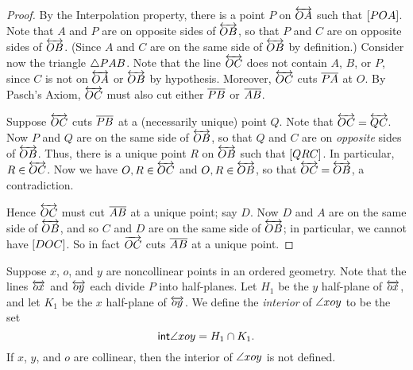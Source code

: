 \begin{proof}
By the Interpolation property, there is a point \(P\) on \(\overleftrightarrow{OA}\) such that \([ P O A ]\).
Note that \(A\) and \(P\) are on opposite sides of \(\overleftrightarrow{OB}\), so that \(P\) and \(C\) are on opposite sides of \(\overleftrightarrow{OB}\).
(Since \(A\) and \(C\) are on the same side of \(\overleftrightarrow{OB}\) by definition.) Consider now the triangle \(\bigtriangleup{PAB}\).
Note that the line \(\overleftrightarrow{OC}\) does not contain \(A\), \(B\), or \(P\), since \(C\) is not on \(\overleftrightarrow{OA}\) or \(\overleftrightarrow{OB}\) by hypothesis.
Moreover, \(\overleftrightarrow{OC}\) cuts \(\overline{PA}\) at \(O\).
By Pasch's Axiom, \(\overleftrightarrow{OC}\) must also cut either \(\overline{PB}\) or \(\overline{AB}\).

Suppose \(\overleftrightarrow{OC}\) cuts \(\overline{PB}\) at a (necessarily unique) point \(Q\).
Note that \(\overleftrightarrow{OC} = \overleftrightarrow{QC}\).
Now \(P\) and \(Q\) are on the same side of \(\overleftrightarrow{OB}\), so that \(Q\) and \(C\) are on \emph{opposite} sides of \(\overleftrightarrow{OB}\).
Thus, there is a unique point \(R\) on \(\overleftrightarrow{OB}\) such that \([ Q R C ]\).
In particular, \(R \in \overleftrightarrow{OC}\).
Now we have \(O,R \in \overleftrightarrow{OC}\) and \(O, R \in \overleftrightarrow{OB}\), so that \(\overleftrightarrow{OC} = \overleftrightarrow{OB}\), a contradiction.

Hence \(\overleftrightarrow{OC}\) must cut \(\overline{AB}\) at a unique point; say \(D\).
Now \(D\) and \(A\) are on the same side of \(\overleftrightarrow{OB}\), and so \(C\) and \(D\) are on the same side of \(\overleftrightarrow{OB}\); in particular, we cannot have \([ D O C ]\).
So in fact \(\overrightarrow{OC}\) cuts \(\overline{AB}\) at a unique point.
\end{proof}

\begin{dfn}
Suppose \(x\), \(o\), and \(y\) are noncollinear points in an ordered geometry.
Note that the lines \(\overleftrightarrow{ox}\) and \(\overleftrightarrow{oy}\) each divide \(P\) into half-planes.
Let \(H_1\) be the \(y\) half-plane of \(\overleftrightarrow{ox}\), and let \(K_1\) be the \(x\) half-plane of \(\overleftrightarrow{oy}\).
We define the \emph{interior} of \(\angle{xoy}\) to be the set \[ \mathsf{int}\angle{xoy} = H_1 \cap K_1. \]
If \(x\), \(y\), and \(o\) are collinear, then the interior of \(\angle{xoy}\) is not defined.
\end{dfn}
